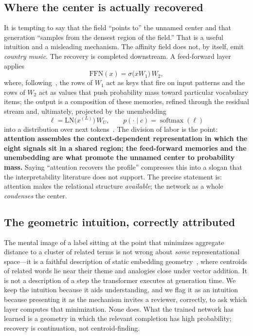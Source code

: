 \documentclass[conference]{IEEEtran}
\theoremstyle{definition}
\newcommand{\softmax}{\operatorname{softmax}}
\newcommand{\prob}{p}
\begin{document}
\subsection{Where the center is actually recovered}
It is tempting to say that the field ``points to'' the unnamed center and that generation ``samples from the densest region of the field.'' That is a useful intuition and a misleading mechanism. The affinity field does not, by itself, emit \emph{country music}. The recovery is completed downstream. A feed-forward layer applies
\begin{equation}
\mathrm{FFN}(x) = \sigma\!\big(x W_1\big)\, W_2 ,
\end{equation}
where, following~\cite{geva2021kv}, the rows of $W_1$ act as keys that fire on input patterns and the rows of $W_2$ act as values that push probability mass toward particular vocabulary items; the output is a composition of these memories, refined through the residual stream and, ultimately, projected by the unembedding
\begin{equation}
\ell = \mathrm{LN}\!\big(x^{(L)}\big)\, W_U, \qquad \prob(\cdot \mid c) = \softmax(\ell)
\end{equation}
into a distribution over next tokens~\cite{geva2022promote}. The division of labor is the point: \textbf{attention assembles the context-dependent representation in which the eight signals sit in a shared region; the feed-forward memories and the unembedding are what promote the unnamed center to probability mass.} Saying ``attention recovers the profile'' compresses this into a slogan that the interpretability literature does not support. The precise statement is: attention makes the relational structure \emph{available}; the network as a whole \emph{condenses} the center.

\subsection{The geometric intuition, correctly attributed}
The mental image of a label sitting at the point that minimizes aggregate distance to a cluster of related terms is not wrong about \emph{some} representational space---it is a faithful description of static embedding geometry~\cite{glove,levygoldberg}, where centroids of related words lie near their theme and analogies close under vector addition. It is not a description of a step the transformer executes at generation time. We keep the intuition because it aids understanding, and we flag it as an intuition because presenting it as the mechanism invites a reviewer, correctly, to ask which layer computes that minimization. None does. What the trained network has learned is a geometry in which the relevant completion has high probability; recovery is continuation, not centroid-finding.
\end{document}
